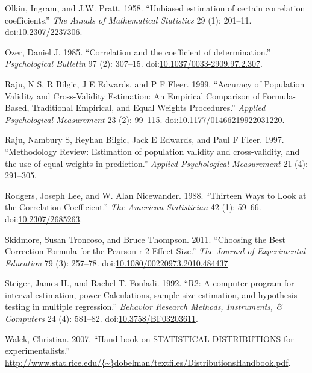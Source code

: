 \documentclass[]{article}
\begin{document}
\hypertarget{ref-Olkin1958}{}
Olkin, Ingram, and J.W. Pratt. 1958. ``Unbiased estimation of certain
correlation coefficients.'' \emph{The Annals of Mathematical Statistics}
29 (1): 201--11.
doi:\href{https://doi.org/10.2307/2237306}{10.2307/2237306}.

\hypertarget{ref-Ozer1985}{}
Ozer, Daniel J. 1985. ``Correlation and the coefficient of
determination.'' \emph{Psychological Bulletin} 97 (2): 307--15.
doi:\href{https://doi.org/10.1037/0033-2909.97.2.307}{10.1037/0033-2909.97.2.307}.

\hypertarget{ref-Raju1999}{}
Raju, N S, R Bilgic, J E Edwards, and P F Fleer. 1999. ``Accuracy of
Population Validity and Cross-Validity Estimation: An Empirical
Comparison of Formula-Based, Traditional Empirical, and Equal Weights
Procedures.'' \emph{Applied Psychological Measurement} 23 (2): 99--115.
doi:\href{https://doi.org/10.1177/01466219922031220}{10.1177/01466219922031220}.

\hypertarget{ref-Raju1997}{}
Raju, Nambury S, Reyhan Bilgic, Jack E Edwards, and Paul F Fleer. 1997.
``Methodology Review: Estimation of population validity and
cross-validity, and the use of equal weights in prediction.''
\emph{Applied Psychological Measurement} 21 (4): 291--305.

\hypertarget{ref-Rodgers1988}{}
Rodgers, Joseph Lee, and W. Alan Nicewander. 1988. ``Thirteen Ways to
Look at the Correlation Coefficient.'' \emph{The American Statistician}
42 (1): 59--66.
doi:\href{https://doi.org/10.2307/2685263}{10.2307/2685263}.

\hypertarget{ref-Skidmore2011}{}
Skidmore, Susan Troncoso, and Bruce Thompson. 2011. ``Choosing the Best
Correction Formula for the Pearson r 2 Effect Size.'' \emph{The Journal
of Experimental Education} 79 (3): 257--78.
doi:\href{https://doi.org/10.1080/00220973.2010.484437}{10.1080/00220973.2010.484437}.

\hypertarget{ref-Steiger1992}{}
Steiger, James H., and Rachel T. Fouladi. 1992. ``R2: A computer program
for interval estimation, power Calculations, sample size estimation, and
hypothesis testing in multiple regression.'' \emph{Behavior Research
Methods, Instruments, \& Computers} 24 (4): 581--82.
doi:\href{https://doi.org/10.3758/BF03203611}{10.3758/BF03203611}.

\hypertarget{ref-Walck2007}{}
Walck, Christian. 2007. ``Hand-book on STATISTICAL DISTRIBUTIONS for
experimentalists.''
\href{http://www.stat.rice.edu/\%7B~\%7Ddobelman/textfiles/DistributionsHandbook.pdf}{http://www.stat.rice.edu/\{\textasciitilde{}\}dobelman/textfiles/DistributionsHandbook.pdf}.
\end{document}
